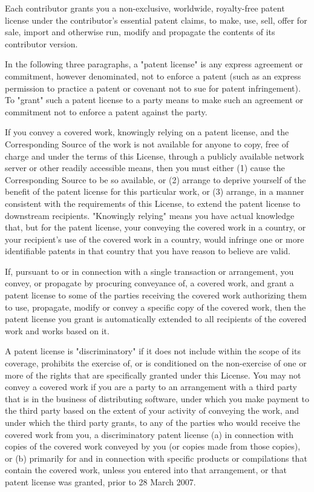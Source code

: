 \documentclass{ctexart}
\begin{document}
  Each contributor grants you a non-exclusive, worldwide, royalty-free
patent license under the contributor's essential patent claims, to
make, use, sell, offer for sale, import and otherwise run, modify and
propagate the contents of its contributor version.

  In the following three paragraphs, a "patent license" is any express
agreement or commitment, however denominated, not to enforce a patent
(such as an express permission to practice a patent or covenant not to
sue for patent infringement).  To "grant" such a patent license to a
party means to make such an agreement or commitment not to enforce a
patent against the party.

  If you convey a covered work, knowingly relying on a patent license,
and the Corresponding Source of the work is not available for anyone
to copy, free of charge and under the terms of this License, through a
publicly available network server or other readily accessible means,
then you must either (1) cause the Corresponding Source to be so
available, or (2) arrange to deprive yourself of the benefit of the
patent license for this particular work, or (3) arrange, in a manner
consistent with the requirements of this License, to extend the patent
license to downstream recipients.  "Knowingly relying" means you have
actual knowledge that, but for the patent license, your conveying the
covered work in a country, or your recipient's use of the covered work
in a country, would infringe one or more identifiable patents in that
country that you have reason to believe are valid.

  If, pursuant to or in connection with a single transaction or
arrangement, you convey, or propagate by procuring conveyance of, a
covered work, and grant a patent license to some of the parties
receiving the covered work authorizing them to use, propagate, modify
or convey a specific copy of the covered work, then the patent license
you grant is automatically extended to all recipients of the covered
work and works based on it.

  A patent license is "discriminatory" if it does not include within
the scope of its coverage, prohibits the exercise of, or is
conditioned on the non-exercise of one or more of the rights that are
specifically granted under this License.  You may not convey a covered
work if you are a party to an arrangement with a third party that is
in the business of distributing software, under which you make payment
to the third party based on the extent of your activity of conveying
the work, and under which the third party grants, to any of the
parties who would receive the covered work from you, a discriminatory
patent license (a) in connection with copies of the covered work
conveyed by you (or copies made from those copies), or (b) primarily
for and in connection with specific products or compilations that
contain the covered work, unless you entered into that arrangement,
or that patent license was granted, prior to 28 March 2007.
\end{document}
